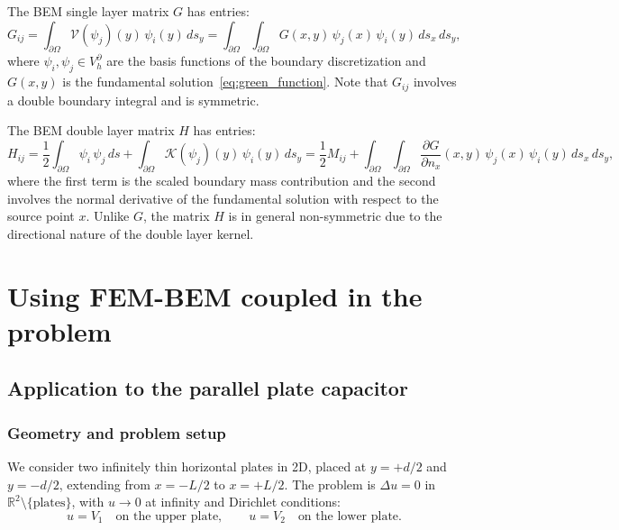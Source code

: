 \documentclass[11pt,onecolumn]{article}
\begin{document}
The BEM single layer matrix $G$ has entries:
\begin{equation}
G_{ij} = \int_{\partial\Omega} \mathcal{V}(\psi_j)(y)\, \psi_i(y) \, ds_y = \int_{\partial\Omega}\int_{\partial\Omega} G(x,y)\, \psi_j(x)\, \psi_i(y) \, ds_x \, ds_y,
\end{equation}
where $\psi_i, \psi_j \in V_h^\partial$ are the basis functions of the boundary discretization and $G(x,y)$ is the fundamental solution~\eqref{eq:green_function}. Note that $G_{ij}$ involves a double boundary integral and is symmetric.

The BEM double layer matrix $H$ has entries:
\begin{equation}
H_{ij} = \frac{1}{2}\int_{\partial\Omega} \psi_i\, \psi_j \, ds + \int_{\partial\Omega} \mathcal{K}(\psi_j)(y)\, \psi_i(y) \, ds_y = \frac{1}{2}M_{ij} + \int_{\partial\Omega}\int_{\partial\Omega} \frac{\partial G}{\partial n_x}(x,y)\, \psi_j(x)\, \psi_i(y) \, ds_x \, ds_y,
\end{equation}
where the first term is the scaled boundary mass contribution and the second involves the normal derivative of the fundamental solution with respect to the source point $x$. Unlike $G$, the matrix $H$ is in general non-symmetric due to the directional nature of the double layer kernel.


\section{Using FEM-BEM coupled in the problem}
\subsection{Application to the parallel plate capacitor}

\subsubsection{Geometry and problem setup}

We consider two infinitely thin horizontal plates in 2D, placed at $y = +d/2$ and $y = -d/2$, 
extending from $x = -L/2$ to $x = +L/2$. The problem is $\Delta u = 0$ in $\mathbb{R}^2 
\setminus \{\text{plates}\}$, with $u \to 0$ at infinity and Dirichlet conditions:
\begin{equation}
u = V_1 \quad \text{on the upper plate}, \qquad u = V_2 \quad \text{on the lower plate}.
\end{equation}
\end{document}
